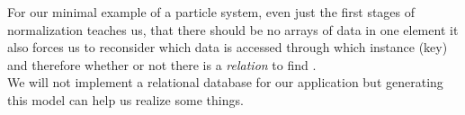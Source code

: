 \begin{table}[H]
	\parbox{0.5\linewidth}{
		\centering
	}	
	\parbox{0.5\linewidth}{
		\centering
	}

	\caption{Example excerpt of a possible first normalization step for the particle system and how it indicates bad design}
	\label{normalized_ps}
\end{table}
For our minimal example of a particle system, even just the first stages of normalization teaches us, that there should be no arrays of data in one element  it also forces us to reconsider which data is accessed through which instance (key) and therefore whether or not there is a \textit{relation} to find .\\We will not implement a relational database for our application but generating this model can help us realize some things.

